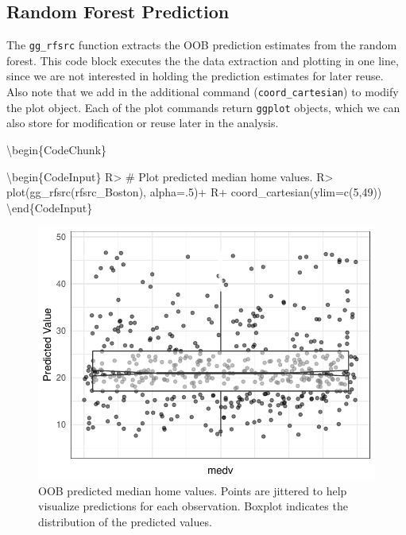 \documentclass[article]{jss}
\begin{document}
\hypertarget{random-forest-prediction}{%
\subsection{Random Forest Prediction}\label{random-forest-prediction}}

The \texttt{gg\_rfsrc} function extracts the OOB prediction estimates
from the random forest. This code block executes the the data extraction
and plotting in one line, since we are not interested in holding the
prediction estimates for later reuse. Also note that we add in the
additional  command (\texttt{coord\_cartesian}) to modify
the plot object. Each of the  plot commands return
\texttt{ggplot} objects, which we can also store for modification or
reuse later in the analysis.

\textbackslash{}begin\{CodeChunk\}

\textbackslash{}begin\{CodeInput\} R\textgreater{} \# Plot predicted
median home values. R\textgreater{} plot(gg\_rfsrc(rfsrc\_Boston),
alpha=.5)+ R+ coord\_cartesian(ylim=c(5,49))
\textbackslash{}end\{CodeInput\}

\begin{figure}

{\centering \includegraphics{Regression-rfsrc_files/figure-latex/rfsrc-1} 

}

\caption[OOB predicted median home values]{OOB predicted median home values. Points are jittered to help visualize predictions for each observation. Boxplot indicates the distribution of the predicted values.}\label{fig:rfsrc}
\end{figure}
\end{document}
